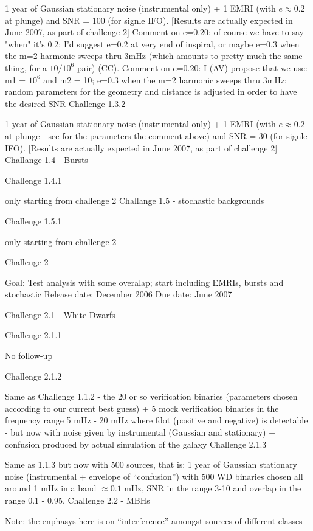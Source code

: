 \documentclass[11pt]{report}
\begin{document}
1 year of Gaussian stationary noise (instrumental only) + 1 EMRI (with $e \approx 0.2$ at plunge) and SNR = 100 (for signle IFO). [Results are actually expected in June 2007, as part of challenge 2]
Comment on e=0.20: of course we have to say "when" it's 0.2; I'd suggest e=0.2 at very end of inspiral, or maybe
e=0.3  when the m=2 harmonic sweeps thru 3mHz (which amounts to pretty much the same thing, for a $10/10^6$ pair) (CC).
Comment on e=0.20: I (AV) propose that we use: m1 = $10^6$ and m2 = 10; e=0.3  when the m=2 harmonic sweeps thru 3mHz; random parameters for the geometry and distance is adjusted in order to have the desired SNR
Challenge 1.3.2

1 year of Gaussian stationary noise (instrumental only) + 1 EMRI (with $e \approx 0.2$ at plunge - see for the parameters the comment above) and SNR = 30 (for signle IFO). [Results are actually expected in June 2007, as part of challenge 2]
Challange 1.4 - Bursts

Challenge 1.4.1

only starting from challenge 2
Challange 1.5 - stochastic backgrounds

Challenge 1.5.1

only starting from challenge 2


Challenge 2

Goal: Test analysis with some overalap; start including EMRIs, bursts and stochastic
Release date: December 2006 
Due date: June 2007 

Challenge 2.1 - White Dwarfs

Challenge 2.1.1

No follow-up

Challenge 2.1.2

Same as Challenge 1.1.2 - the 20 or so verification binaries (parameters chosen according to our current best guess) + 5 mock verification binaries in the frequency range 5 mHz - 20 mHz where fdot (positive and negative) is detectable - but now with noise given by instrumental (Gaussian and stationary) + confusion produced by actual simulation of the galaxy
Challenge 2.1.3

Same as 1.1.3 but now with 500 sources, that is: 1 year of Gaussian stationary noise (instrumental + envelope of “confusion”) with 500 WD binaries chosen all around 1 mHz in a band $\approx 0.1$ mHz, SNR in the range 3-10 and overlap in the range 0.1 - 0.95.
Challenge 2.2 - MBHs

Note: the enphasys here is on “interference” amongst sources of different classes
\end{document}
